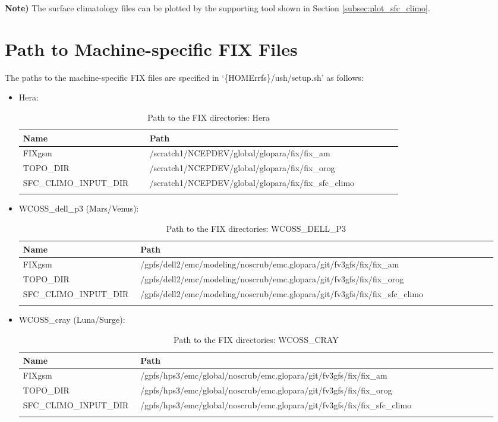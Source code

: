 \documentclass[11pt,fleqn]{report}              %
\begin{document}
{\bf Note)} The surface climatology files can be plotted by the supporting tool shown in Section \ref{subsec:plot_sfc_climo}.





\section{Path to Machine-specific FIX Files}
\label{sec:lam_fix_dir}

The paths to the machine-specific FIX files are specified in `\{HOMErrfs\}/ush/setup.sh' as follows:

\begin{itemize}
\item Hera:
{
\fontsize{10}{12}\selectfont
\begin{longtable}{p{0.3\linewidth} | p{0.6\linewidth} }
\hline
\hline
 Name & Path \\
\hline
 FIXgsm & /scratch1/NCEPDEV/global/glopara/fix/fix\_am \\
 TOPO\_DIR & /scratch1/NCEPDEV/global/glopara/fix/fix\_orog \\
 SFC\_CLIMO\_INPUT\_DIR & /scratch1/NCEPDEV/global/glopara/fix/fix\_sfc\_climo \\
\hline
\caption{Path to the FIX directories: Hera}
\label{table:fix_dir_hera}
\end{longtable}
}

\item WCOSS\_dell\_p3 (Mars/Venus):
{
\fontsize{9}{11}\selectfont
\begin{longtable}{ p{0.24\linewidth} | p{0.73\linewidth} }
\hline
\hline
 Name & Path \\
\hline
 FIXgsm & /gpfs/dell2/emc/modeling/noscrub/emc.glopara/git/fv3gfs/fix/fix\_am \\
 TOPO\_DIR & /gpfs/dell2/emc/modeling/noscrub/emc.glopara/git/fv3gfs/fix/fix\_orog \\
 SFC\_CLIMO\_INPUT\_DIR & /gpfs/dell2/emc/modeling/noscrub/emc.glopara/git/fv3gfs/fix/fix\_sfc\_climo \\
\hline
\caption{Path to the FIX directories: WCOSS\_DELL\_P3}
\label{table:fix_dir_hera}
\end{longtable}
}

\item WCOSS\_cray (Luna/Surge):
{
\fontsize{9}{11}\selectfont
\begin{longtable}{p{0.24\linewidth} | p{0.73\linewidth} }
\hline
\hline
Name & Path \\
\hline
FIXgsm & /gpfs/hps3/emc/global/noscrub/emc.glopara/git/fv3gfs/fix/fix\_am \\
TOPO\_DIR & /gpfs/hps3/emc/global/noscrub/emc.glopara/git/fv3gfs/fix/fix\_orog \\
SFC\_CLIMO\_INPUT\_DIR & /gpfs/hps3/emc/global/noscrub/emc.glopara/git/fv3gfs/fix/fix\_sfc\_climo \\
\hline
\caption{Path to the FIX directories: WCOSS\_CRAY}
\label{table:fix_dir_hera}
\end{longtable}
}



\end{itemize}
\end{document}
